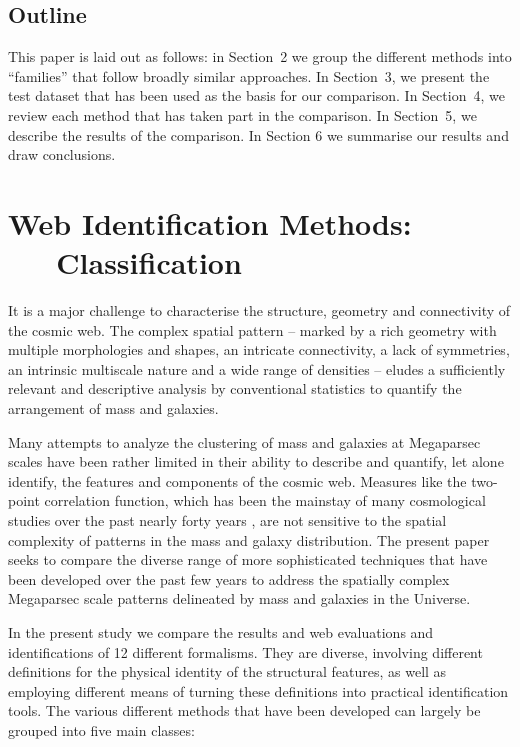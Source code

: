 \documentclass[useAMS,usenatbib]{mnras}
\begin{document}
\subsection{Outline}
This paper is laid out as follows: in Section~2 we group the different methods into ``families'' that follow broadly similar approaches. In Section~3, we present the test dataset that has been used as the basis for our comparison. In Section~4, we review each method that has taken part in the comparison. In Section~5, we describe the results of the comparison. In Section 6 we summarise our results and draw conclusions.

\section{Web Identification Methods: \ \ \ Classification}
\label{section:methods}

%

It is a major challenge to characterise the structure, geometry and connectivity of the cosmic web. The complex spatial pattern -- marked  
by a rich geometry with multiple morphologies and shapes, an intricate connectivity, a lack of  symmetries, an intrinsic multiscale nature and 
a wide range of densities -- eludes a sufficiently relevant and descriptive analysis by conventional statistics to quantify the arrangement of 
mass and galaxies. 

Many attempts to analyze the clustering of mass and galaxies at Megaparsec scales have been rather limited in their ability to describe and quantify, let 
alone identify, the features and components of the cosmic web. Measures like the two-point correlation function, which has been the mainstay of many 
cosmological studies over the past nearly forty years \citep{peebles1980}, are not sensitive to the spatial complexity of patterns in the mass and galaxy distribution.  
The present paper seeks to compare the diverse range of more sophisticated techniques that have been developed over the past few years to address the 
spatially complex Megaparsec scale patterns delineated by mass and galaxies in the Universe. 

In the present study we compare the results and web evaluations and identifications of 12 different formalisms. 
They are diverse, involving different definitions for the physical identity of the structural features, as well 
as employing different means of turning these definitions into practical identification tools. The various 
different methods that have been developed can largely be grouped into five main classes:
\end{document}
